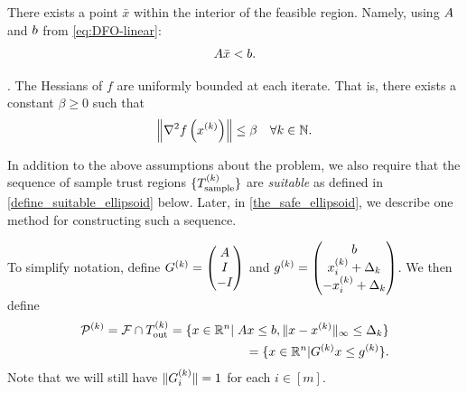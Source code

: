 \documentclass{article}
\begin{document}
\begin{assumption}
\label{interior_point}
There exists a point $\bar x$ within the interior of the feasible region.
Namely, using ${A}$ and ${b}$ from \cref{eq:DFO-linear}:
\begin{align}
{A} \bar x < {b}.
\end{align}
\end{assumption}


\begin{assumption}
\label{uniformly_bounded_hessians_of_f} .
The Hessians of $f$ are uniformly bounded at each iterate. That is, there exists a constant $\beta \ge 0$ such that
\begin{align*}
\left\|\nabla^2 f\left(x^{(k)}\right)\right\| \le \beta \quad \forall k \in \mathbb N.
\end{align*}
\end{assumption}

In addition to the above assumptions about the problem, we also require that the sequence of sample trust regions $\{{T_{\text{sample}}^{(k)}}\}$ are \emph{suitable} as defined in \cref{define_suitable_ellipsoid} below.   
  Later, in \cref{the_safe_ellipsoid}, we describe one method for constructing such a sequence.

To simplify notation, define $G^{(k)} = \begin{pmatrix} {A} \\ I \\ -I \end{pmatrix}$ and 
${g^{(k)}} = \begin{pmatrix} {b} \\ x_i^{(k)}+\Delta_k \\ -x_i^{(k)}+\Delta_k \end{pmatrix}$.
We then define
\begin{align}
{{\mathcal{P}}^{(k)}} = {\mathcal F} \cap {T_{\text{out}}^{(k)}} =  \{x \in \mathbb R^n | \; {A} x \le {b}, \|x - x^{(k)}\|_{\infty} \le \Delta_k \} \label{polyhedron_k}  \\
= \{x \in \mathbb R^n | G^{(k)} x \le {g^{(k)}} \}. \nonumber
\end{align}
Note that we will still have $\|G^{(k)}_i\| = 1$ for each $i \in [m]$.
\end{document}
